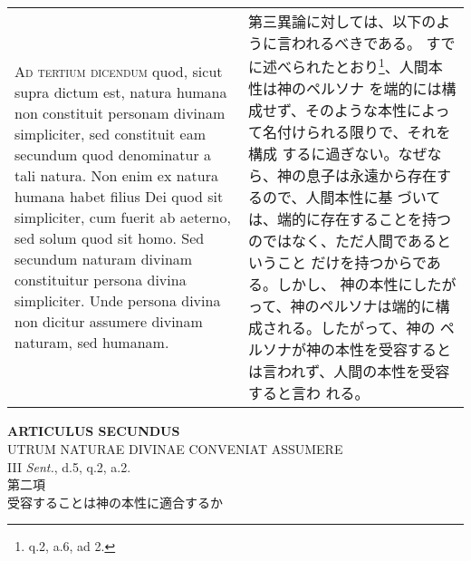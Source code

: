 \documentclass[10pt]{jsarticle} %
\begin{document}
\begin{longtable}{p{21em}p{21em}}
{\scshape Ad tertium dicendum} quod, sicut supra dictum est, natura humana non
constituit personam divinam simpliciter, sed constituit eam secundum
quod denominatur a tali natura. Non enim ex natura humana habet filius
Dei quod sit simpliciter, cum fuerit ab aeterno, sed solum quod sit
homo. Sed secundum naturam divinam constituitur persona divina
simpliciter. Unde persona divina non dicitur assumere divinam naturam,
sed humanam.


&

第三異論に対しては、以下のように言われるべきである。
すでに述べられたとおり\footnote{q.2, a.6, ad 2.}、人間本性は神のペルソナ
 を端的には構成せず、そのような本性によって名付けられる限りで、それを構成
 するに過ぎない。なぜなら、神の息子は永遠から存在するので、人間本性に基
 づいては、端的に存在することを持つのではなく、ただ人間であるということ
 だけを持つからである。しかし、
 神の本性にしたがって、神のペルソナは端的に構成される。したがって、神の
 ペルソナが神の本性を受容するとは言われず、人間の本性を受容すると言わ
 れる。


\end{longtable}
\newpage






\begin{center}
 {\Large {\bf ARTICULUS SECUNDUS}}\\
 {\large UTRUM NATURAE DIVINAE CONVENIAT ASSUMERE}\\
 {\footnotesize III {\itshape Sent.}, d.5, q.2, a.2.}\\
 {\Large 第二項\\受容することは神の本性に適合するか}
\end{center}
\end{document}
